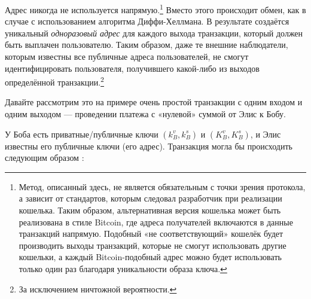 Адрес никогда не используется напрямую.\footnote{Метод, описанный здесь, не является обязательным с точки зрения протокола, а зависит от стандартов, которым следовал разработчик при реализации кошелька. Таким образом, альтернативная версия кошелька может быть реализована в стиле Bitcoin, где адреса получателей включаются в данные транзакций напрямую. Подобный «не соответствующий» кошелёк будет производить выходы транзакций, которые не смогут использовать другие кошельки, а каждый Bitcoin-подобный  адрес можно будет использовать только один раз благодаря уникальности образа ключа.} Вместо этого происходит обмен, как в случае с использованием алгоритма Диффи-Хеллмана. В результате создаётся уникальный {\em одноразо\-вый адрес} для каждого выхода транзакции, который должен быть выплачен пользователю. Таким образом, даже те внешние наблюдатели, которым известны все публичные адреса пользователей, не смогут идентифицировать пользователя, получившего какой-либо из выхо\-дов определённой транзакции.\footnote{За исключением ничтожной вероятности.}


Давайте рассмотрим это на примере очень простой транзакции с одним входом и одним выходом — проведении платежа с «нулевой» суммой от Элис к Бобу.

У Боба есть приватные/публичные ключи $(k_B^v, k_B^s)$ и $(K_B^v, K_B^s)$, и Элис известны его публичные ключи (его адрес). Транзакция могла бы происходить следующим образом \cite{cryptoNoteWhitePaper}:

